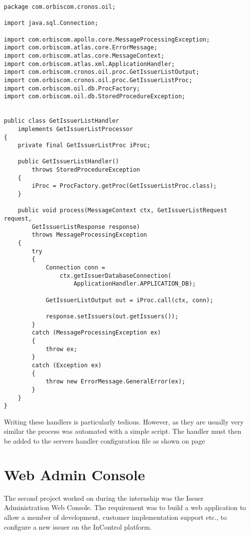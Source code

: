 \documentclass[a4paper, 11pt, titlepage]{article}
\begin{document}
\begin{verbatim} 
package com.orbiscom.cronos.oil; 
 
import java.sql.Connection; 
 
import com.orbiscom.apollo.core.MessageProcessingException; 
import com.orbiscom.atlas.core.ErrorMessage; 
import com.orbiscom.atlas.core.MessageContext; 
import com.orbiscom.atlas.xml.ApplicationHandler; 
import com.orbiscom.cronos.oil.proc.GetIssuerListOutput; 
import com.orbiscom.cronos.oil.proc.GetIssuerListProc; 
import com.orbiscom.oil.db.ProcFactory; 
import com.orbiscom.oil.db.StoredProcedureException; 
 
 
public class GetIssuerListHandler 
    implements GetIssuerListProcessor 
{ 
    private final GetIssuerListProc iProc; 
 
    public GetIssuerListHandler() 
        throws StoredProcedureException 
    { 
        iProc = ProcFactory.getProc(GetIssuerListProc.class); 
    } 
 
    public void process(MessageContext ctx, GetIssuerListRequest request,
        GetIssuerListResponse response) 
        throws MessageProcessingException 
    { 
        try 
        { 
            Connection conn = 
                ctx.getIssuerDatabaseConnection(
                    ApplicationHandler.APPLICATION_DB); 
 
            GetIssuerListOutput out = iProc.call(ctx, conn); 
 
            response.setIssuers(out.getIssuers()); 
        } 
        catch (MessageProcessingException ex) 
        { 
            throw ex; 
        } 
        catch (Exception ex) 
        { 
            throw new ErrorMessage.GeneralError(ex); 
        } 
    } 
} 
\end{verbatim} 
Writing these handlers is particularly tedious. However, as they are usually very similar the process was automated with a simple script. 
The handler must then be added to the servers handler configuration file as shown on page \pageref{handlerset} 
 
\cite{OIL} 
 
\newpage

\section{Web Admin Console} 
The second project worked on during the internship was the Issuer Administration Web Console. The requirement was to build a web application to allow a member of development, customer implementation support etc., to configure a new issuer on the InControl platform.
\end{document}
